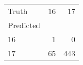 \begin{tabular}{lrr}
\toprule
Truth & 16 & 17 \\
Predicted &  &  \\
\midrule
16 & 1 & 0 \\
17 & 65 & 443 \\
\bottomrule
\end{tabular}
